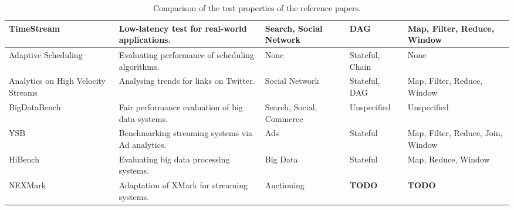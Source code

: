 \begin{table}[H]
{\begin{tabular}{|p{3cm}|p{4cm}|p{3cm}|p{2.5cm}|p{2.5cm}|}
      TimeStream\cite{timestream}
      & Low-latency test for real-world applications.
      & Search, Social Network
      & DAG
      & Map, Filter, Reduce, Window
      \\\hline

      Adaptive Scheduling\cite{storm}
      & Evaluating performance of scheduling algorithms.
      & None
      & Stateful, Chain
      & None
      \\\hline

      Analytics on High Velocity Streams\cite{storm2}
      & Analysing trends for links on Twitter.
      & Social Network
      & Stateful, DAG
      & Map, Filter, Reduce, Window
      \\\hline

      BigDataBench\cite{bigdatabench}
      & Fair performance evaluation of big data systems.
      & Search, Social, Commerce
      & Unspecified
      & Unspecified
      \\\hline

      YSB\cite{ysb}
      & Benchmarking streaming systems via Ad analytics.
      & Ads
      & Stateful
      & Map, Filter, Reduce, Join, Window
      \\\hline

      HiBench\cite{hibench}
      & Evaluating big data processing systems.
      & Big Data
      & Stateful
      & Map, Reduce, Window
      \\\hline

      NEXMark\cite{nexmark}
      & Adaptation of XMark for streaming systems.
      & Auctioning
      & {\bfseries TODO}
      & {\bfseries TODO}
      \\\hline
    \end{tabular}
  }
  \caption{Comparison of the test properties of the reference papers.}
  \label{table:test-properties}
\end{table}

